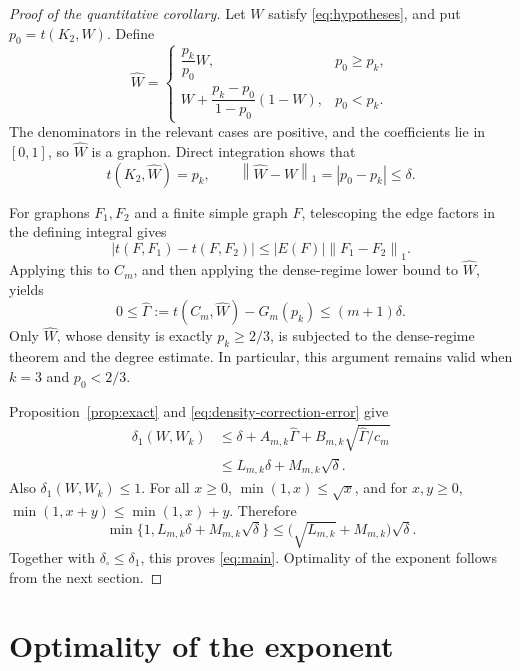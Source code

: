 \documentclass[11pt]{article}
\theoremstyle{remark}
\newcommand{\dsq}{\delta_{\square}}
\newcommand{\norm}[1]{\left\lVert #1\right\rVert}
\begin{document}
\begin{proof}[Proof of the quantitative corollary]
Let $W$ satisfy \eqref{eq:hypotheses}, and put $p_0=t(K_2,W)$.
Define
\begin{equation}\label{eq:density-correction}
 \widehat W=
 \begin{cases}
 \dfrac{p_k}{p_0}W,&p_0\geq p_k,\\[6pt]
 W+\dfrac{p_k-p_0}{1-p_0}(1-W),&p_0<p_k.
 \end{cases}
\end{equation}
The denominators in the relevant cases are positive, and the
coefficients lie in $[0,1]$, so $\widehat W$ is a graphon.
Direct integration shows that
\begin{equation}\label{eq:density-correction-error}
 t(K_2,\widehat W)=p_k,
 \qquad\norm{\widehat W-W}_1=|p_0-p_k|\leq\delta.
\end{equation}

For graphons $F_1,F_2$ and a finite simple graph $F$, telescoping the
edge factors in the defining integral gives
\[
 |t(F,F_1)-t(F,F_2)|\leq |E(F)|\norm{F_1-F_2}_1.
\]
Applying this to $C_m$, and then applying the dense-regime lower
bound to $\widehat W$, yields
\[
 0\leq\widehat\Gamma
 :=t(C_m,\widehat W)-G_m(p_k)
 \leq(m+1)\delta.
\]
Only $\widehat W$, whose density is exactly $p_k\geq2/3$, is subjected
to the dense-regime theorem and the degree estimate. In particular,
this argument remains valid when $k=3$ and $p_0<2/3$.

Proposition~\ref{prop:exact} and
\eqref{eq:density-correction-error} give
\begin{align*}
 \delta_1(W,W_k)
 &\leq\delta+A_{m,k}\widehat\Gamma
          +B_{m,k}\sqrt{\widehat\Gamma/c_m}\\
 &\leq L_{m,k}\delta+M_{m,k}\sqrt{\delta}.
\end{align*}
Also $\delta_1(W,W_k)\leq1$.
For all $x\geq0$, $\min(1,x)\leq\sqrt{x}$, and for $x,y\geq0$,
$\min(1,x+y)\leq\min(1,x)+y$.
Therefore
\[
 \min\{1,L_{m,k}\delta+M_{m,k}\sqrt{\delta}\}
 \leq\bigl(\sqrt{L_{m,k}}+M_{m,k}\bigr)\sqrt{\delta}.
\]
Together with $\dsq\leq\delta_1$, this proves \eqref{eq:main}.
Optimality of the exponent follows from the next section.
\end{proof}

\section{Optimality of the exponent}\label{sec:sharpness}
\end{document}
